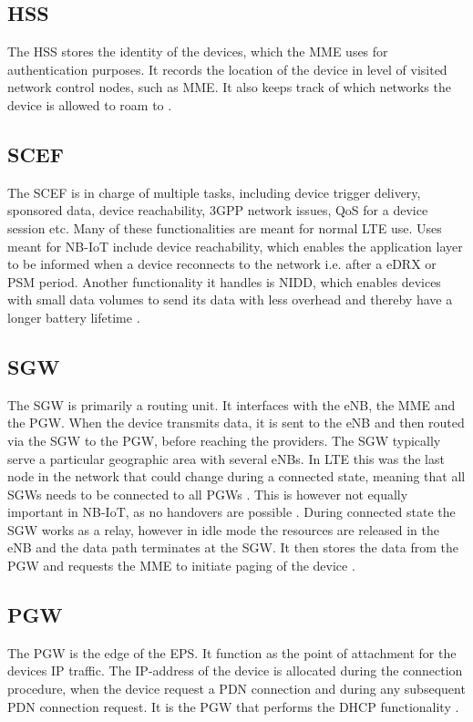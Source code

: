 \subsection{\gls{HSS}}
The \gls{HSS} stores the identity of the devices, which the \gls{MME} uses for authentication purposes. It records the location of the device in level of visited network control nodes, such as \gls{MME}. It also keeps track of which networks the device is allowed to roam to \citep[ch. 3]{book_LTE_for_UMTS}.

\subsection{\gls{SCEF}}
The \gls{SCEF} is in charge of multiple tasks, including device trigger delivery, sponsored data, device reachability, \gls{3GPP} network issues, \gls{QoS} for a device session etc. Many of these functionalities are meant for normal \gls{LTE} use. Uses meant for \gls{NB-IoT} include device reachability, which enables the application layer to be informed when a device reconnects to the network i.e. after a \gls{eDRX} or  \gls{PSM} period. Another functionality it handles is \gls{NIDD}, which enables devices with small data volumes to send its data with less overhead and thereby have a longer battery lifetime .

\subsection{\gls{SGW}}
The \gls{SGW} is primarily a routing unit. It interfaces with the \gls{eNB}, the \gls{MME} and the \gls{PGW}. When the device transmits data, it is sent to the \gls{eNB} and then routed via the \gls{SGW} to the \gls{PGW}, before reaching the providers. The \gls{SGW} typically serve a particular geographic area with several \gls{eNB}s. In \gls{LTE} this was the last node in the network that could change during a connected state, meaning that all \gls{SGW}s needs to be connected to all \gls{PGW}s \citep[ch. 3]{book_LTE_for_UMTS}. This is however not equally important in \gls{NB-IoT}, as no handovers are possible \citep{REL-13}. During connected state the \gls{SGW} works as a relay, however in idle mode the resources are released in the \gls{eNB} and the data path terminates at the \gls{SGW}. It then stores the data from the \gls{PGW} and requests the \gls{MME} to initiate paging of the device \citep[ch. 3]{book_LTE_for_UMTS}.

\subsection{\gls{PGW}}
The \gls{PGW} is the edge of the \gls{EPS}. It function as the point of attachment for the devices \gls{IP} traffic. The \gls{IP}-address of the device is allocated during the connection procedure, when the device request a \gls{PDN} connection and during any subsequent \gls{PDN} connection request. It is the \gls{PGW} that performs the \gls{DHCP} functionality \citep[ch. 3]{book_LTE_for_UMTS}.

